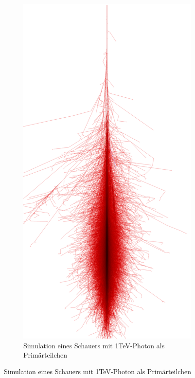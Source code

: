 \begin{figure}
 \begin{subfigure}{0.4\textwidth}
  \includegraphics[width=\textwidth]{./Plots/03_MonteCarlos/Photon_1TeV_CORSIKA.png}
  \caption{Simulation eines Schauers mit 1TeV-Photon als Primärteilchen}

\end{subfigure}
\end{figure}

